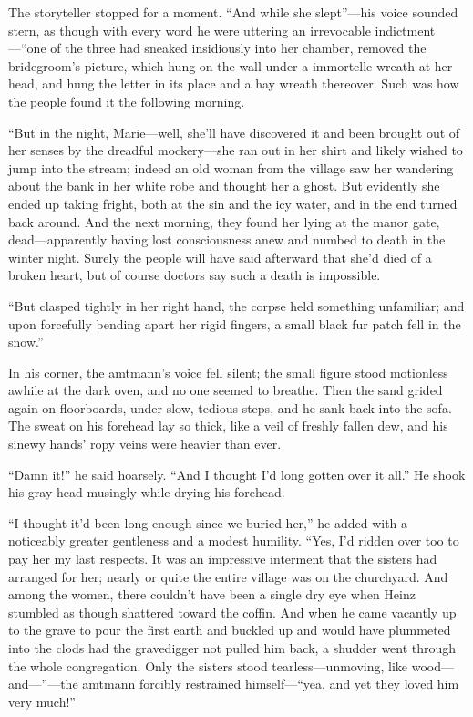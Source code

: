 \documentclass[12pt,a4paper]{article}
\begin{document}
The storyteller stopped for a moment. “And while she slept”—his voice sounded stern, as though with every word he were uttering an irrevocable indictment—“one of the three had sneaked insidiously into her chamber, removed the bridegroom’s picture, which hung on the wall under a immortelle wreath at her head, and hung the letter in its place and a hay wreath thereover. Such was how the people found it the following morning.

“But in the night, Marie—well, she’ll have discovered it and been brought out of her senses by the dreadful mockery—she ran out in her shirt and likely wished to jump into the stream; indeed an old woman from the village saw her wandering about the bank in her white robe and thought her a ghost. But evidently she ended up taking fright, both at the sin and the icy water, and in the end turned back around. And the next morning, they found her lying at the manor gate, dead—apparently having lost consciousness anew and numbed to death in the winter night. Surely the people will have said afterward that she’d died of a broken heart, but of course doctors say such a death is impossible.

“But clasped tightly in her right hand, the corpse held something unfamiliar; and upon forcefully bending apart her rigid fingers, a small black fur patch fell in the snow.”

In his corner, the amtmann’s voice fell silent; the small figure stood motionless awhile at the dark oven, and no one seemed to breathe. Then the sand grided again on floorboards, under slow, tedious steps, and he sank back into the sofa. The sweat on his forehead lay so thick, like a veil of freshly fallen dew, and his sinewy hands’ ropy veins were heavier than ever.

“Damn it!” he said hoarsely. “And I thought I’d long gotten over it all.” He shook his gray head musingly while drying his forehead.

“I thought it’d been long enough since we buried her,” he added with a noticeably greater gentleness and a modest humility. “Yes, I’d ridden over too to pay her my last respects. It was an impressive interment that the sisters had arranged for her; nearly or quite the entire village was on the churchyard. And among the women, there couldn’t have been a single dry eye when Heinz stumbled as though shattered toward the coffin. And when he came vacantly up to the grave to pour the first earth and buckled up and would have plummeted into the clods had the gravedigger not pulled him back, a shudder went through the whole congregation. Only the sisters stood tearless—unmoving, like wood—and—”—the amtmann forcibly restrained himself—“yea, and yet they loved him very much!”
\end{document}
